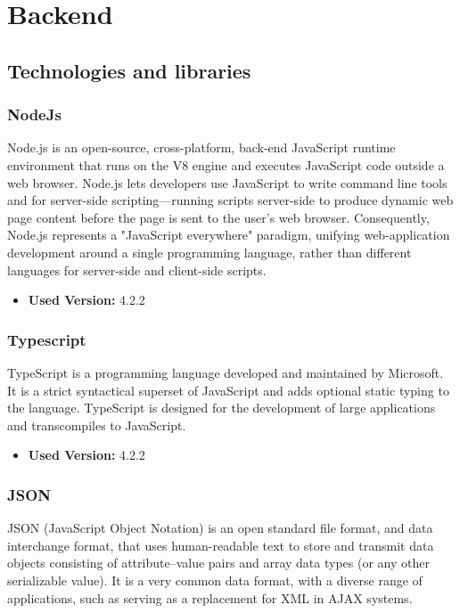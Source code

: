 \section{Backend}

\subsection{Technologies and libraries}\label{_technologies}

\subsubsection{NodeJs}
Node.js is an open-source, cross-platform, back-end JavaScript runtime environment that runs on the V8 engine and executes JavaScript code outside a web browser. Node.js lets developers use JavaScript to write command line tools and for server-side scripting—running scripts server-side to produce dynamic web page content before the page is sent to the user's web browser. Consequently, Node.js represents a "JavaScript everywhere" paradigm, unifying web-application development around a single programming language, rather than different languages for server-side and client-side scripts.

\begin{itemize}
    \item \textbf{Used Version:} 4.2.2
\end{itemize}

\subsubsection{Typescript}
TypeScript is a programming language developed and maintained by Microsoft. It is a strict syntactical superset of JavaScript and adds optional static typing to the language. TypeScript is designed for the development of large applications and transcompiles to JavaScript.

\begin{itemize}
    \item \textbf{Used Version:} 4.2.2
\end{itemize}

\subsubsection{JSON}
JSON (JavaScript Object Notation) is an open standard file format, and data interchange format, that uses human-readable text to store and transmit data objects consisting of attribute–value pairs and array data types (or any other serializable value). It is a very common data format, with a diverse range of applications, such as serving as a replacement for XML in AJAX systems.


